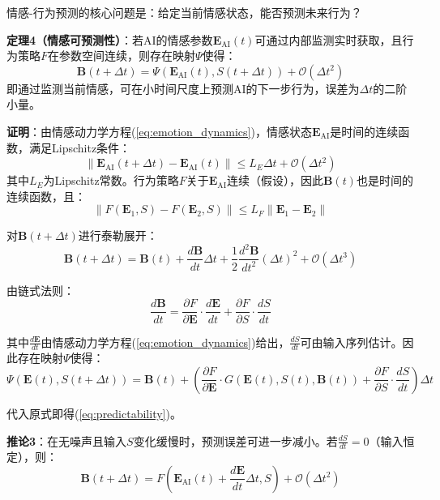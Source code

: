 \documentclass[12pt,a4paper]{article}
\theoremstyle{plain}
\newcommand{\ve}[1]{\bm{#1}}                    %
\newcommand{\Evec}{\ve{E}}                        %
\newcommand{\Bvec}{\ve{B}}                        %
\begin{document}
情感-行为预测的核心问题是：给定当前情感状态，能否预测未来行为？

\textbf{定理4（情感可预测性）}：若AI的情感参数$\Evec_{\text{AI}}(t)$可通过内部监测实时获取，且行为策略$F$在参数空间连续，则存在映射$\Psi$使得：
\begin{equation}
\Bvec(t+\Delta t) = \Psi\left( \Evec_{\text{AI}}(t), S(t+\Delta t) \right) + \mathcal{O}(\Delta t^2)
\label{eq:predictability}
\end{equation}
即通过监测当前情感，可在小时间尺度上预测AI的下一步行为，误差为$\Delta t$的二阶小量。

\textbf{证明}：由情感动力学方程(\ref{eq:emotion_dynamics})，情感状态$\Evec_{\text{AI}}$是时间的连续函数，满足Lipschitz条件：
\begin{equation}
\| \Evec_{\text{AI}}(t+\Delta t) - \Evec_{\text{AI}}(t) \| \leq L_E \Delta t + \mathcal{O}(\Delta t^2)
\end{equation}
其中$L_E$为Lipschitz常数。行为策略$F$关于$\Evec_{\text{AI}}$连续（假设），因此$\Bvec(t)$也是时间的连续函数，且：
\begin{equation}
\| F(\Evec_1, S) - F(\Evec_2, S) \| \leq L_F \| \Evec_1 - \Evec_2 \|
\end{equation}

对$\Bvec(t+\Delta t)$进行泰勒展开：
\begin{equation}
\Bvec(t+\Delta t) = \Bvec(t) + \frac{d\Bvec}{dt} \Delta t + \frac{1}{2} \frac{d^2\Bvec}{dt^2} (\Delta t)^2 + \mathcal{O}(\Delta t^3)
\end{equation}

由链式法则：
\begin{equation}
\frac{d\Bvec}{dt} = \frac{\partial F}{\partial \Evec} \cdot \frac{d\Evec}{dt} + \frac{\partial F}{\partial S} \cdot \frac{dS}{dt}
\end{equation}

其中$\frac{d\Evec}{dt}$由情感动力学方程(\ref{eq:emotion_dynamics})给出，$\frac{dS}{dt}$可由输入序列估计。因此存在映射$\Psi$使得：
\begin{equation}
\Psi(\Evec(t), S(t+\Delta t)) = \Bvec(t) + \left( \frac{\partial F}{\partial \Evec} \cdot G(\Evec(t), S(t), \Bvec(t)) + \frac{\partial F}{\partial S} \cdot \frac{dS}{dt} \right) \Delta t
\end{equation}

代入原式即得(\ref{eq:predictability})。

\textbf{推论3}：在无噪声且输入$S$变化缓慢时，预测误差可进一步减小。若$\frac{dS}{dt} = 0$（输入恒定），则：
\begin{equation}
\Bvec(t+\Delta t) = F\left( \Evec_{\text{AI}}(t) + \frac{d\Evec}{dt} \Delta t, S \right) + \mathcal{O}(\Delta t^2)
\end{equation}
\end{document}
